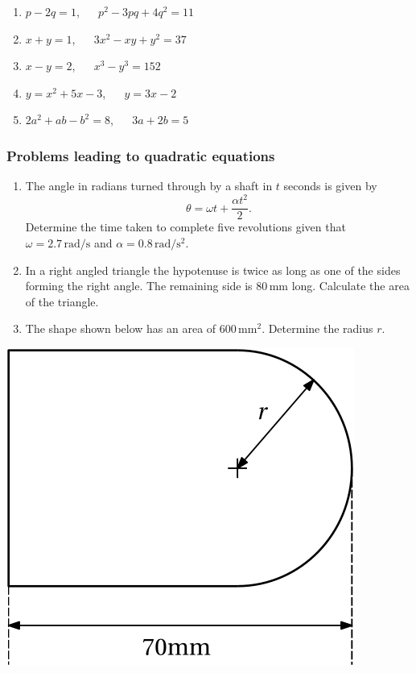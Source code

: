 \documentclass[
  12pt,
  oneside]{book}
\providecommand{\tightlist}{%
  \setlength{\itemsep}{0pt}\setlength{\parskip}{0pt}}
\theoremstyle{definition}
\theoremstyle{definition}
\theoremstyle{definition}
\theoremstyle{definition}
\theoremstyle{remark}
\begin{document}
\begin{enumerate}
  \begin{enumerate}
  \def\labelenumii{\roman{enumii})}
  \tightlist
  \item
    \(p-2q=1\), ~~ \(p^2-3pq+4q^2=11\)
  \item
    \(x+y=1\), ~~ \(3x^2-xy+y^2=37\)
  \item
    \(x-y=2\), ~~ \(x^3-y^3=152\)
  \item
    \(y=x^2+5x-3\), ~~ \(y=3x-2\)
  \item
    \(2a^2+ab-b^2=8\), ~~ \(3a+2b=5\)
  \end{enumerate}
\end{enumerate}

\subsubsection*{Problems leading to quadratic equations}\label{problems-leading-to-quadratic-equations}

\begin{enumerate}
\def\labelenumi{\arabic{enumi}.}
\setcounter{enumi}{4}
\item
  The angle in radians turned through by a shaft in \(t\) seconds is given by
  \[\theta=\omega t+\frac{\alpha t^2}{2}.\]
  Determine the time taken to complete five revolutions given that \(\omega=2.7\, \mathrm{rad/s}\) and \(\alpha=0.8\, \mathrm{rad/s^2}\).
\item
  In a right angled triangle the hypotenuse is twice as long as one of the sides forming the right angle. The remaining side is \(80\,\mathrm{mm}\) long. Calculate the area of the triangle.
\item
  The shape shown below has an area of \(600\,\mathrm{mm^2}\). Determine the radius \(r\).
\end{enumerate}

\begin{center}\includegraphics{t03-shape1} \end{center}
\end{document}
